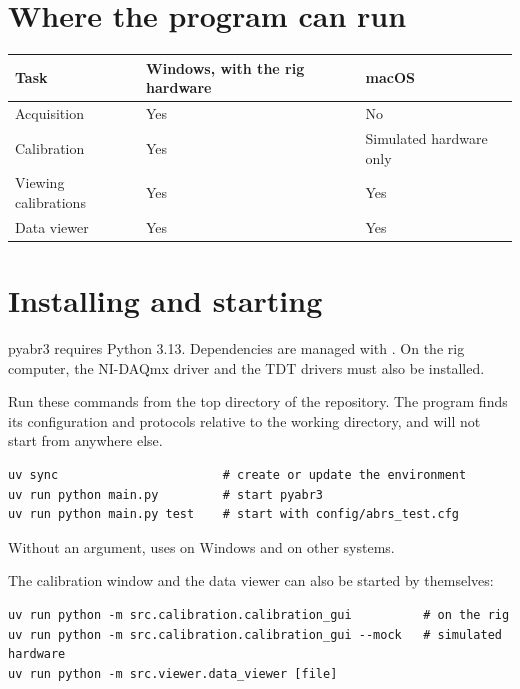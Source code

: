 \section{Where the program can run}

\begin{center}
\begin{tabular}{@{}lll@{}}
\toprule
Task & Windows, with the rig hardware & macOS \\
\midrule
Acquisition & Yes & No \\
Calibration & Yes & Simulated hardware only \\
Viewing calibrations & Yes & Yes \\
Data viewer & Yes & Yes \\
\bottomrule
\end{tabular}
\end{center}

\section{Installing and starting}

pyabr3 requires Python 3.13. Dependencies are managed with .
On the rig computer, the NI-DAQmx driver and the TDT drivers must
also be installed.

Run these commands from the top directory of the repository. The program finds its
configuration and protocols relative to the working directory, and will not start
from anywhere else.

\begin{lstlisting}
uv sync                       # create or update the environment
uv run python main.py         # start pyabr3
uv run python main.py test    # start with config/abrs_test.cfg
\end{lstlisting}

Without an argument,  uses  on Windows and
 on other systems.

The calibration window and the data viewer can also be started by themselves:

\begin{lstlisting}
uv run python -m src.calibration.calibration_gui          # on the rig
uv run python -m src.calibration.calibration_gui --mock   # simulated hardware
uv run python -m src.viewer.data_viewer [file]
\end{lstlisting}

